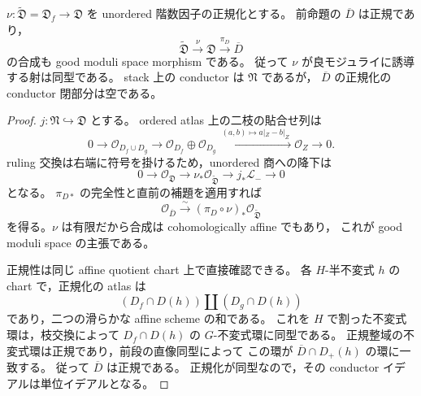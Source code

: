 \begin{corollary}[階数因子の良モジュライ像は正規]
\label{cor:qa-rank-divisor-good-image-normal}
$\nu:\widetilde{\mathfrak D}=\mathfrak D_f\to\mathfrak D$
を unordered 階数因子の正規化とする。
前命題の $\overline D$ は正規であり，
\[
 \widetilde{\mathfrak D}\xrightarrow{\nu}\mathfrak D
        \xrightarrow{\pi_D}\overline D
\]
の合成も good moduli space morphism である。
従って $\nu$ が良モジュライに誘導する射は同型である。
stack 上の conductor は $\mathfrak N$ であるが，
$\overline D$ の正規化の conductor 閉部分は空である。
\end{corollary}
\begin{proof}
$j:\mathfrak N\hookrightarrow\mathfrak D$ とする。
ordered atlas 上の二枝の貼合せ列は
\[
 0\longrightarrow\mathcal O_{D_f\cup D_g}
 \longrightarrow\mathcal O_{D_f}\oplus\mathcal O_{D_g}
 \xrightarrow{\ (a,b)\mapsto a|_Z-b|_Z\ }
 \mathcal O_Z\longrightarrow0.
\]
ruling 交換は右端に符号を掛けるため，unordered 商への降下は
\[
 0\longrightarrow\mathcal O_{\mathfrak D}
 \longrightarrow\nu_*\mathcal O_{\widetilde{\mathfrak D}}
 \longrightarrow j_*\mathcal L_-
 \longrightarrow0
 \tag{BD}\label{eq:qa-boundary-branch-sign-sequence}
\]
となる。
$\pi_{D*}$ の完全性と直前の補題を適用すれば
\[
 \mathcal O_{\overline D}
   \xrightarrow{\ \sim\ }
   (\pi_D\circ\nu)_*\mathcal O_{\widetilde{\mathfrak D}}
\]
を得る。$\nu$ は有限だから合成は cohomologically affine でもあり，
これが good moduli space の主張である。

正規性は同じ affine quotient chart 上で直接確認できる。
各 $H$-半不変式 $h$ の chart で，正規化の atlas は
\[
 (D_f\cap D(h))\amalg(D_g\cap D(h))
\]
であり，二つの滑らかな affine scheme の和である。
これを $H$ で割った不変式環は，枝交換によって
$D_f\cap D(h)$ の $G$-不変式環に同型である。
正規整域の不変式環は正規であり，前段の直像同型によって
この環が $\overline D\cap D_+(h)$ の環に一致する。
従って $\overline D$ は正規である。
正規化が同型なので，その conductor イデアルは単位イデアルとなる。
\end{proof}

